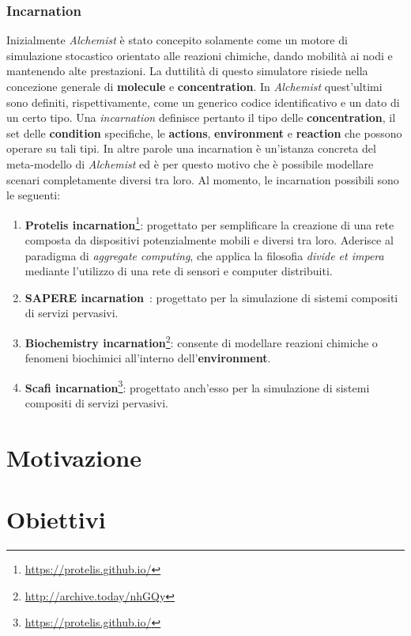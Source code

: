 \subsubsection{Incarnation}
Inizialmente \textit{Alchemist} è stato concepito solamente come un motore di simulazione stocastico orientato alle reazioni chimiche, dando mobilità ai nodi e mantenendo alte prestazioni. 
La duttilità di questo simulatore risiede nella concezione generale di \textbf{molecule} e \textbf{concentration}. In \textit{Alchemist} quest'ultimi sono definiti, rispettivamente, come un generico codice identificativo e un dato di un certo tipo. Una \textit{incarnation} definisce pertanto il tipo delle \textbf{concentration}, il set delle \textbf{condition} specifiche, le \textbf{actions}, \textbf{environment} e \textbf{reaction} che possono operare su tali tipi.
In altre parole una incarnation è un'istanza concreta del meta-modello di \textit{Alchemist} ed è per questo motivo che è possibile modellare scenari completamente diversi tra loro.
Al momento, le incarnation possibili sono le seguenti:
\begin{enumerate}
	\item \textbf{Protelis incarnation}\footnote{\url{https://protelis.github.io/}}:  progettato per semplificare la creazione di una rete composta da dispositivi potenzialmente mobili e diversi tra loro. Aderisce al paradigma di \textit{aggregate computing}, che applica la filosofia \textit{divide et impera} mediante l'utilizzo di una rete di sensori e computer distribuiti.
	\item \textbf{SAPERE incarnation}~\cite{Zambonelli2015}: progettato per la simulazione di sistemi compositi di servizi pervasivi.
	\item \textbf{Biochemistry incarnation}\footnote{\url{http://archive.today/nhGQy}}: consente di modellare reazioni chimiche o fenomeni biochimici all'interno dell'\textbf{environment}.
	\item \textbf{Scafi incarnation}\footnote{\url{https://protelis.github.io/}}:  progettato anch'esso per la simulazione di sistemi compositi di servizi pervasivi.
\end{enumerate}

\section{Motivazione}
\section{Obiettivi}